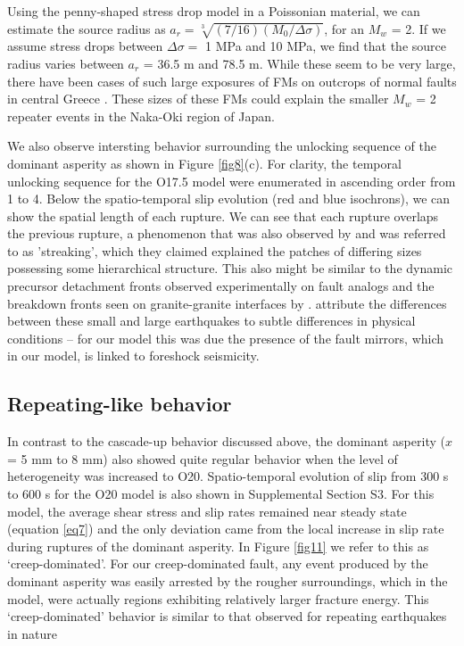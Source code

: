 \documentclass[preprint,1p, 10pt,authoryear]{elsarticle}
\begin{document}
Using the \citet{Eshelby1957} penny-shaped stress drop model in a Poissonian material, we can estimate the source radius as $a_{r} = \sqrt[3]{(7/16)(M_{0}/\Delta\sigma)}$, for an $M_{w}$ = 2. If we assume stress drops between $\Delta \sigma  = $ 1 MPa and 10 MPa, we find that the source radius varies between $a_{r}$ = 36.5 m and 78.5 m.  While these seem to be very large, there have been cases of such large exposures of FMs on outcrops of normal faults in central Greece \citep{Jackson1999}. These sizes of these FMs could explain the smaller $M_{w}$ = 2 repeater events in the Naka-Oki region of Japan.  

We also observe intersting behavior surrounding the unlocking sequence of the dominant asperity as shown in Figure \ref{fig8}(c). For clarity, the temporal unlocking sequence for the O17.5 model were enumerated in ascending order from 1 to 4.  Below the spatio-temporal slip evolution (red and blue isochrons), we can show the spatial length of each rupture. We can see that each rupture overlaps the previous rupture, a phenomenon that was also observed by \citet{Okuda2018a} and was referred to as 'streaking', which they claimed explained the patches of differing sizes possessing some hierarchical structure. This also might be similar to the dynamic precursor detachment fronts observed experimentally on fault analogs \citep{Rubinstein2004,Rubinstein2006} and the breakdown fronts seen on granite-granite interfaces by \citep{Ke2018}. \citet{Okuda2018a} attribute the differences between these small and large earthquakes to subtle differences in physical conditions -- for our model this was due the presence of the fault mirrors, which in our model, is linked to foreshock seismicity.

\subsection{Repeating-like behavior}
In contrast to the cascade-up behavior discussed above, the dominant asperity ($x$ = 5 mm to 8 mm) also showed quite regular behavior when the level of heterogeneity was increased to O20.  Spatio-temporal evolution of slip from 300 s to 600 s for the O20 model is also shown in Supplemental Section S3. For this model, the average shear stress and slip rates remained near steady state (equation \eqref{eq7}) and the only deviation came from the local increase in slip rate during ruptures of the dominant asperity.  In Figure \ref{fig11} we refer to this as `creep-dominated'. For our creep-dominated fault, any event produced by the dominant asperity was easily arrested by the rougher surroundings, which in the model, were actually regions exhibiting relatively larger fracture energy.  This `creep-dominated' behavior is similar to that observed for repeating earthquakes in nature \citep[e.g., ][]{Beeler2001,Uchida2019}
\end{document}
